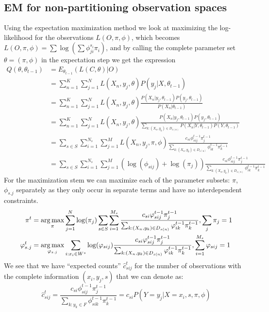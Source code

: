 \subsection{EM for non-partitioning observation spaces}
Using the expectation maximization method we look at maximizing the log-likelihood for the observations $L(O,\pi,\phi)$, which becomes $L(O,\pi,\phi)=\sum \log (\sum \phi_{ji}^{s_i}\pi_i)$, and by calling the complete parameter set $\theta = (\pi, \phi)$ in the expectation step we get the expression 
\begin{equation*}
\begin{split}
Q(\theta,\theta_{t-1})%
&=E_{\theta_{t-1}}\left ( L(C,\theta) | O \right )\\
&= \sum_{n=1}^K \sum_{j=1}^N
L(X_n, y_j,\theta)
P(y_j|X,\theta_{t-1})\\
&= \sum_{n=1}^K \sum_{j=1}^N
L(X_n,y_j,\theta)
\frac{P(X_n|y_j,\theta_{t-1})P(y_j,\theta_{t-1})}
{P(X_n|\theta_{t-1})}\\
&= \sum_{n=1}^K \sum_{j=1}^N
L(X_n, y_j,\theta)
\frac{P(X_n|y_j,\theta_{t-1})P(y_j,\theta_{t-1})}
{\sum_{k:(X_n,y_k)\in D_{s(n)}}P(X_n|Y,\theta_{t-1})P(Y,\theta_{t-1})}\\
&= \sum_{s \in S} \sum_{i=1}^{N_s} \sum_{j=1}^M
L(X_n,y_j,\pi,\phi)
\frac{c_{si}\phi^{t-1}_{sij}\pi^{t-1}_{j}}
{\sum_{k:(X_n,y_k)\in D_{s(n)}}\phi^{t-1}_{ik}\pi^{t-1}_{k}}\\
&= \sum_{s \in S} \sum_{i=1}^{N_s} \sum_{j=1}^M
(\log(\phi_{sij}) + \log(\pi_j))
\frac{c_{si}\phi^{t-1}_{sij}\pi^{t-1}_{j}}
{\sum_{k:(X_n,y_k)\in D_{s(n)}}\phi^{t-1}_{ik}\pi^{t-1}_{k}}
\end{split}
\end{equation*}
For the maximization stem we can maximize each of the parameter subsets: $\pi$, $\phi_{s.j}$ separately as they only occur in separate terms and have no interdependent constraints.
\begin{equation*}
\begin{split}
\pi^t &= \operatorname*{arg\,max}_{\pi}
\sum_{j=1}^N\log(\pi_j) \sum_{s \in S} \sum_{i=1}^{M_s}
\frac{c_{si}\varphi^{t-1}_{sij}\pi^{t-1}_{j}}{\sum_{k:(X_n,y_k)\in D_{s(n)}}\varphi^{t-1}_{ik}\pi^{t-1}_{k}}
, \sum_j\pi_j = 1\\
\varphi_{s.j}^t &= \operatorname*{arg\,max}_{\varphi_{s.j}} \sum_{i: x_i\in W^s}
\log(\varphi_{sij})
\frac{c_{si}\varphi^{t-1}_{sij}\pi^{t-1}_{j}}
{\sum_{k:(X_n,y_k)\in D_{s(n)}}\varphi^{t-1}_{ik}\pi^{t-1}_{k}}
, \sum_{i=1}^{M_s} \varphi_{sij} = 1
\end{split}
\end{equation*}
We see that we have ``expected counts'' $\hat c^t_{sij}$ for the number of observations with the complete information $(x_i,y_j,s)$ that we can denote as:
\begin{equation*}
\hat c^t_{sij} = \frac{c_{si}\phi^{t-1}_{sij}\pi^{t-1}_{j}}{\sum_{k: y_k \in F}\phi^{t-1}_{sik}\pi^{t-1}_{k}} = c_{si}P(Y=y_j|X=x_i,s,\pi, \phi)
\end{equation*}

